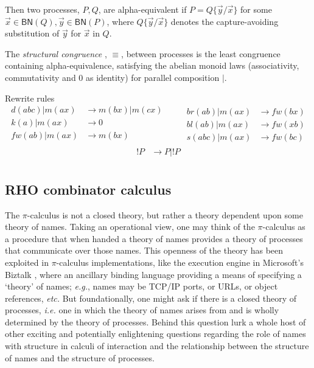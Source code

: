\documentclass{llncs}
\newcommand{\pic}{$\pi$-calculus}
\newcommand{\pzero}{\mathbin{0}}
\newcommand{\scong}{\mathbin{\equiv}}
\newcommand{\boundnames}[1]{\mathbin{\mathsf{BN}(#1)}}
\newcommand{\red}{\rightarrow}
\begin{document}
\begin{definition}
Then two processes, $P,Q$, are alpha-equivalent if $P = Q\{\vec{y}/\vec{x}\}$ for
some $\vec{x} \in \boundnames{Q},\vec{y} \in \boundnames{P}$, where $Q\{\vec{y}/\vec{x}\}$
denotes the capture-avoiding substitution of $\vec{y}$ for $\vec{x}$ in $Q$.
\end{definition}

\begin{definition}
  The {\em structural congruence} \cite{SangiorgiWalker} , $\equiv$,
  between processes is the least congruence containing
  alpha-equivalence, satisfying the abelian monoid laws
  (associativity, commutativity and $\pzero$ as identity) for parallel
  composition $|$.
\end{definition}

Rewrite rules
\[\begin{array}{rl}
  d(abc) | m(ax) & \red m(bx) | m(cx) \\
  k(a) | m(ax) & \red 0 \\
  fw(ab) | m(ax) & \red m(bx) \\
\end{array} \quad \quad
\begin{array}{rl}
  br(ab) | m(ax) & \red fw(bx) \\
  bl(ab) | m(ax) & \red fw(xb) \\
  s(abc) | m(ax) & \red fw(bc)
\end{array}\]
\[\begin{array}{rl}
  !P & \red P|!P \\
\end{array}\]

\subsection{RHO combinator calculus}
  The {\pic} is not a closed theory, but
rather a theory dependent upon some theory of names. Taking an
operational view, one may think of the {\pic} as a procedure that when
handed a theory of names provides a theory of processes that
communicate over those names. This openness of the theory has been
exploited in {\pic} implementations, like the execution engine in
Microsoft's Biztalk \cite{biztalk}, where an ancillary binding
language providing a means of specifying a `theory' of names; {\em e.g.},
names may be TCP/IP ports, or URLs, or object references, {\em etc.}  But
foundationally, one might ask if there is a closed theory of
processes, {\em i.e.} one in which the theory of names arises from and is
wholly determined by the theory of processes. Behind this question
lurk a whole host of other exciting and potentially enlightening
questions regarding the role of names with structure in calculi of
interaction and the relationship between the structure of names and
the structure of processes.
\end{document}
